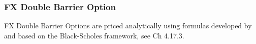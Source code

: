 \subsubsection{FX Double Barrier Option}
\label{pricing:fx_doublebarrieroption}

FX Double Barrier Options are priced analytically using formulas developed by
\cite{Merton_1973} and \cite{Rubinstein_1991} based on the Black-Scholes framework,
see \cite{Haug_1997} Ch 4.17.3.